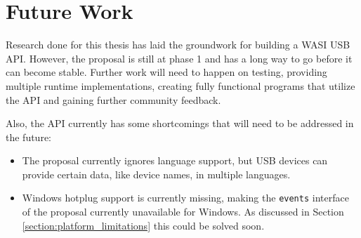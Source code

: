 \chapter{Future Work}
Research done for this thesis has laid the groundwork for building a \acrshort{WASI} \acrshort{USB} \acrshort{API}. However, the proposal is still at phase 1 and has a long way to go before it can become stable. Further work will need to happen on testing, providing multiple runtime implementations, creating fully functional programs that utilize the \acrshort{API} and gaining further community feedback.

Also, the \acrshort{API} currently has some shortcomings that will need to be addressed in the future:

\begin{itemize}
\item The proposal currently ignores language support, but \acrshort{USB} devices can provide certain data, like device names, in multiple languages.
\item Windows hotplug support is currently missing, making the \texttt{events} interface of the proposal currently unavailable for Windows. As discussed in Section \ref{section:platform_limitations} this could be solved soon.
\end{itemize}